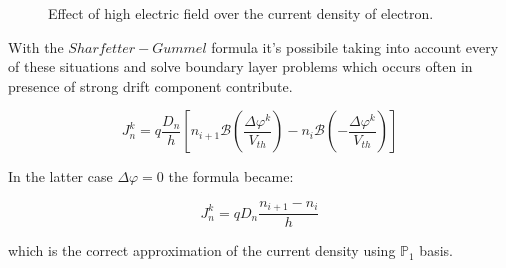 \begin{figure}[!h]

\caption{Effect of high electric field over the current density of electron.}
\label{fig: SF figure}
\end{figure}


With the $Sharfetter-Gummel$ formula it's possibile taking into account every of these situations and solve boundary layer problems which occurs often in presence of strong drift component contribute.

 \begin{equation}
\label{eq: scharfetter gummel 1D electron}
J_n^k=q\frac{D_n}{h}
\left[ n_{i+1}\mathcal{B}\left(\frac{\Delta \varphi^k}{V_{th}}\right)- n_i\mathcal{B}\left(-\frac{\Delta \varphi^k}{V_{th}}\right)\right]  
\end{equation}

In the latter case $\Delta \varphi=0$ the formula became:

\begin{equation}
J_n^k=qD_n\frac{n_{i+1}-n_{i}}{h}
\end{equation}

which is the correct approximation of the current density using $\mathbb{P}_1$ basis. 

